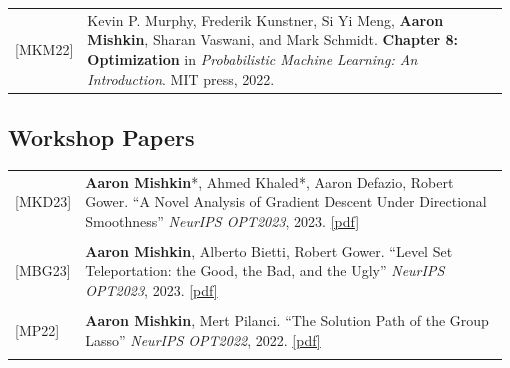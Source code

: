 \documentclass[10pt]{article}
\begin{document}
\begin{longtable}{C{0.1\linewidth} L{0.88\linewidth}}
[MKM22]\!\! & Kevin P.  Murphy, Frederik Kunstner, Si Yi Meng, \textbf{Aaron Mishkin},
                                                             Sharan Vaswani, and Mark Schmidt.  \textbf{Chapter 8: Optimization} in
                                                             \textit{Probabilistic Machine Learning: An Introduction}.  MIT press, 2022.
\end{longtable}

\subsection*{Workshop Papers}

\begin{longtable}{C{0.1\linewidth} L{0.88\linewidth}}
[MKD23]\!\!              & \textbf{Aaron Mishkin}*, Ahmed Khaled*, Aaron Defazio, Robert Gower. ``A
                                                             Novel Analysis of Gradient Descent Under Directional Smoothness''
                                                             \textit{NeurIPS OPT2023}, 2023.
                                                             \href{https://opt-ml.org/papers/2023/paper77.pdf}{[pdf]}                                                                                                   \\
                                                                                                                                                                                                    \\

                                                             [MBG23]       & \textbf{Aaron Mishkin}, Alberto Bietti, Robert Gower. ``Level Set
                                                             Teleportation: the Good, the Bad, and the Ugly'' \textit{NeurIPS OPT2023},
                                                             2023. \href{https://opt-ml.org/papers/2023/paper35.pdf}{[pdf]}
                                                             \\
                                                                                                                                                                                                    \\

                                                             [MP22]       & \textbf{Aaron Mishkin}, Mert Pilanci. ``The Solution Path of the Group
                                                             Lasso'' \textit{NeurIPS OPT2022}, 2022.
                                                             \href{https://opt-ml.org/papers/2022/paper63.pdf}{[pdf]}
                                                             \\
                                                                                                                                                                                                    \\


\end{longtable}
\end{document}
